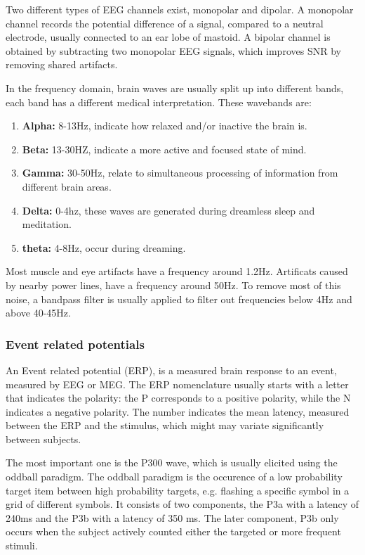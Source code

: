 
Two different types of EEG channels exist, monopolar and dipolar. A monopolar channel records the potential difference of a signal, compared to a neutral electrode, usually connected to an ear lobe of mastoid. A bipolar channel is obtained by subtracting two monopolar EEG signals, which improves SNR by removing shared artifacts\cite{MonoBiPolar}. 

In the frequency domain, brain waves are usually split up into different bands\cite{EmotionRelativePower,WavesSite}, each band has a different medical interpretation. These wavebands are:
\begin{enumerate}
\item \textbf{Alpha:} 8-13Hz, indicate how relaxed and/or inactive the brain is.
\item \textbf{Beta:} 13-30HZ, indicate a more active and focused state of mind.
\item \textbf{Gamma:} 30-50Hz, relate to simultaneous processing of information from different brain areas.
\item \textbf{Delta:} 0-4hz, these waves are generated during dreamless sleep and meditation.
\item \textbf{theta:} 4-8Hz, occur during dreaming.
\end{enumerate}
Most muscle and eye artifacts have a frequency around 1.2Hz. Artificats caused by nearby power lines, have a frequency around 50Hz\cite{ExtendedPaper}. To remove most of this noise, a bandpass filter is usually applied to filter out frequencies below 4Hz and above 40-45Hz.

\subsubsection{Event related potentials}

An Event related potential (ERP), is a measured brain response to an event, measured by EEG or MEG. The ERP nomenclature usually starts with a letter that indicates the polarity: the P corresponds to a positive polarity, while the N indicates a negative polarity. The number indicates the mean latency, measured between the ERP and the stimulus, which might may variate significantly between subjects.

\npar

The most important one is the P300 wave, which is usually elicited using the oddball paradigm. The oddball paradigm is the occurence of a low probability target item between high probability targets, e.g. flashing a specific symbol in a grid of different symbols. It consists of two components, the P3a with a latency of 240ms and the P3b with a latency of 350 ms\cite{P300TwoParts}. The later component, P3b only occurs when the subject actively counted either the targeted or more frequent stimuli.

